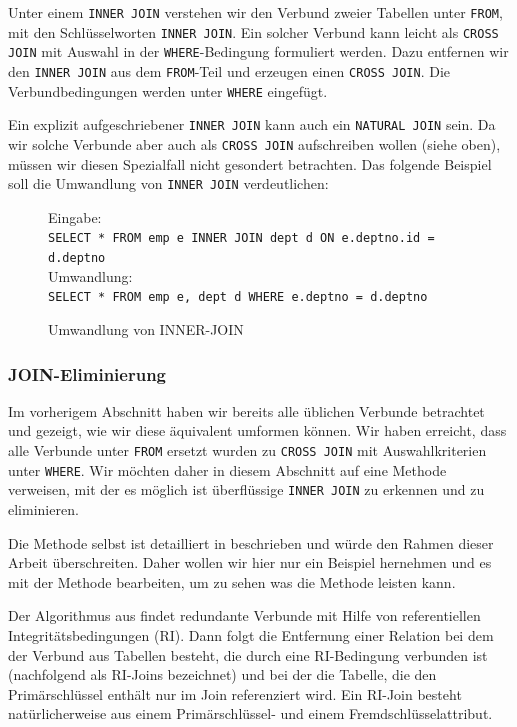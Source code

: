 Unter einem \verb|INNER JOIN| verstehen wir den Verbund zweier Tabellen unter \verb|FROM|, mit den Schlüsselworten \verb|INNER JOIN|. Ein solcher Verbund kann leicht als \verb|CROSS JOIN| mit Auswahl in der \verb|WHERE|-Bedingung formuliert werden. Dazu entfernen wir den \verb|INNER JOIN| aus dem \verb|FROM|-Teil und erzeugen einen \verb|CROSS JOIN|. Die Verbundbedingungen werden unter \verb|WHERE| eingefügt.

Ein explizit aufgeschriebener \verb|INNER JOIN| kann auch ein \verb|NATURAL JOIN| sein. Da wir solche Verbunde aber auch als \verb|CROSS JOIN| aufschreiben wollen (siehe oben), müssen wir diesen Spezialfall nicht gesondert betrachten. Das folgende Beispiel soll die Umwandlung von \verb|INNER JOIN| verdeutlichen:

\begin{figure}[H]
Eingabe:\\
\verb|SELECT * FROM emp e INNER JOIN dept d ON e.deptno.id = d.deptno|\\

Umwandlung:\\
\verb|SELECT * FROM emp e, dept d WHERE e.deptno = d.deptno|\\
\caption{Umwandlung von INNER-JOIN}
\end{figure}


\subsubsection{JOIN-Eliminierung}

Im vorherigem Abschnitt haben wir bereits alle üblichen Verbunde betrachtet und gezeigt, wie wir diese äquivalent umformen können. Wir haben erreicht, dass alle Verbunde unter \verb|FROM| ersetzt wurden zu \verb|CROSS JOIN| mit Auswahlkriterien unter \verb|WHERE|. Wir möchten daher in diesem Abschnitt auf eine Methode verweisen, mit der es möglich ist überflüssige \verb|INNER JOIN| zu erkennen und zu eliminieren.

Die Methode selbst ist detailliert in \cite{joinelem2} beschrieben und würde den Rahmen dieser Arbeit überschreiten. Daher wollen wir hier nur ein Beispiel hernehmen und es mit der Methode bearbeiten, um zu sehen was die Methode leisten kann.

Der Algorithmus aus \cite{joinelem2} findet redundante Verbunde mit Hilfe von referentiellen Integritätsbedingungen (RI). Dann folgt die Entfernung einer Relation bei dem der Verbund aus Tabellen besteht, die durch eine RI-Bedingung verbunden ist (nachfolgend als RI-Joins bezeichnet) und bei der die Tabelle, die den Primärschlüssel enthält nur im Join referenziert wird. Ein RI-Join besteht natürlicherweise aus einem Primärschlüssel- und einem Fremdschlüsselattribut.

